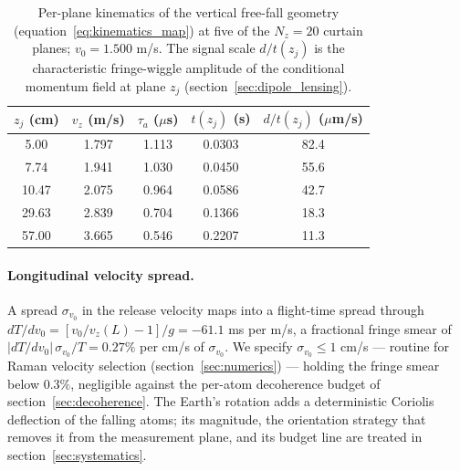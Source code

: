 \documentclass[11pt,a4paper]{article}
\begin{document}
\begin{table}[t]
\centering
\small
\caption{Per-plane kinematics of the vertical free-fall geometry (equation~\eqref{eq:kinematics_map}) at five of the $N_z = 20$ curtain planes; $v_0 = 1.500$ m/s. The signal scale $d/t(z_j)$ is the characteristic fringe-wiggle amplitude of the conditional momentum field at plane $z_j$ (section~\ref{sec:dipole_lensing}).}
\label{tab:kinematics}
\begin{tabular}{ccccc}
\toprule
$z_j$ (cm) & $v_z$ (m/s) & $\tau_a$ ($\mu$s) & $t(z_j)$ (s) & $d/t(z_j)$ ($\mu$m/s) \\
\midrule
5.00 & 1.797 & 1.113 & 0.0303 & 82.4 \\
7.74 & 1.941 & 1.030 & 0.0450 & 55.6 \\
10.47 & 2.075 & 0.964 & 0.0586 & 42.7 \\
29.63 & 2.839 & 0.704 & 0.1366 & 18.3 \\
57.00 & 3.665 & 0.546 & 0.2207 & 11.3 \\
\bottomrule
\end{tabular}
\end{table}

\paragraph{Longitudinal velocity spread.} A spread $\sigma_{v_0}$ in the release velocity maps into a flight-time spread through $dT/dv_0 = [v_0/v_z(L) - 1]/g = -61.1$ ms per m/s, a fractional fringe smear of $|dT/dv_0|\,\sigma_{v_0}/T = 0.27\%$ per cm/s of $\sigma_{v_0}$. We specify $\sigma_{v_0} \leq 1$ cm/s --- routine for Raman velocity selection (section~\ref{sec:numerics}) --- holding the fringe smear below $0.3\%$, negligible against the per-atom decoherence budget of section~\ref{sec:decoherence}. The Earth's rotation adds a deterministic Coriolis deflection of the falling atoms; its magnitude, the orientation strategy that removes it from the measurement plane, and its budget line are treated in section~\ref{sec:systematics}.
\end{document}

